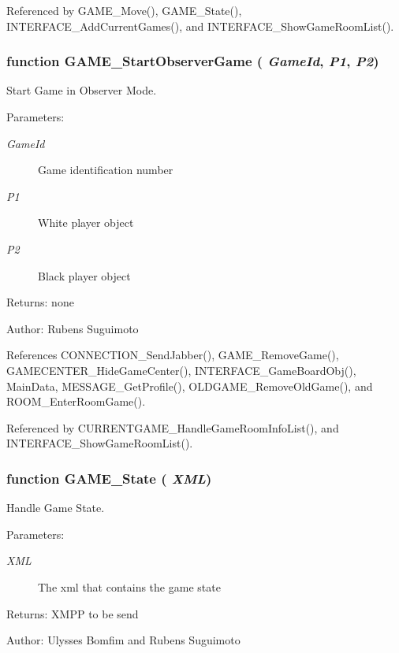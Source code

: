 Referenced by GAME\_\-Move(), GAME\_\-State(), INTERFACE\_\-AddCurrentGames(), and INTERFACE\_\-ShowGameRoomList().
\subsubsection[GAME\_\-StartObserverGame]{\setlength{\rightskip}{0pt plus 5cm}function GAME\_\-StartObserverGame ( {\em GameId}, \/   {\em P1}, \/   {\em P2})}\label{game_2game_8js_4f0e773656189b3da2ed13b737bd4085}


Start Game in Observer Mode. 

\begin{Desc}
\item[Parameters:]
\begin{description}
\item[{\em GameId}]Game identification number \item[{\em P1}]White player object \item[{\em P2}]Black player object \end{description}
\end{Desc}
\begin{Desc}
\item[Returns:]none \end{Desc}
\begin{Desc}
\item[Author:]Rubens Suguimoto \end{Desc}


References CONNECTION\_\-SendJabber(), GAME\_\-RemoveGame(), GAMECENTER\_\-HideGameCenter(), INTERFACE\_\-GameBoardObj(), MainData, MESSAGE\_\-GetProfile(), OLDGAME\_\-RemoveOldGame(), and ROOM\_\-EnterRoomGame().

Referenced by CURRENTGAME\_\-HandleGameRoomInfoList(), and INTERFACE\_\-ShowGameRoomList().
\subsubsection[GAME\_\-State]{\setlength{\rightskip}{0pt plus 5cm}function GAME\_\-State ( {\em XML})}\label{game_2game_8js_7f2a8e4b530ce5baa73ebb3079e9ca73}


Handle Game State. 

\begin{Desc}
\item[Parameters:]
\begin{description}
\item[{\em XML}]The xml that contains the game state \end{description}
\end{Desc}
\begin{Desc}
\item[Returns:]XMPP to be send \end{Desc}
\begin{Desc}
\item[Author:]Ulysses Bomfim and Rubens Suguimoto \end{Desc}


